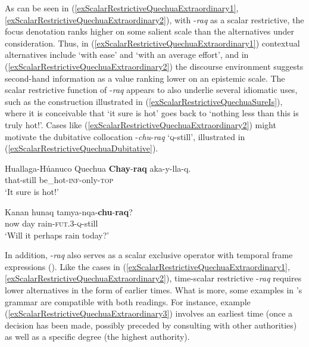 As can be seen in (\ref{exScalarRestrictiveQuechuaExtraordinary1}, \ref{exScalarRestrictiveQuechuaExtraordinary2}), with \mbox{-\textit{raq}} as a scalar restrictive, the focus denotation ranks higher on some salient scale than the alternatives under consideration. Thus, in (\ref{exScalarRestrictiveQuechuaExtraordinary1}) contextual alternatives include \lq with ease' and \lq with an average effort', and in (\ref{exScalarRestrictiveQuechuaExtraordinary2}) the discourse environment suggests second-hand information as a value ranking lower on an epistemic scale. The scalar restrictive function of \mbox{-\textit{raq}} appears to also underlie several idiomatic uses, such as the construction illustrated in (\ref{exScalarRestrictiveQuechuaSureIs}), where it is conceivable that \lq it sure is hot' goes back to \lq nothing less than this is truly hot!'. Cases like (\ref{exScalarRestrictiveQuechuaExtraordinary2}) might motivate the dubitative collocation \mbox{-\textit{chu}}\mbox{-\textit{raq}} \lq \textsc{q}-still', illustrated in (\ref{exScalarRestrictiveQuechuaDubitative}).\pagebreak

\begin{exe}
	\ex 
	\begin{xlist}
		\exi{} Huallaga-Húanuco Quechua
		\ex \label{exScalarRestrictiveQuechuaSureIs}
		\gll \textbf{Chay}-\textbf{raq} aka-y-lla-q.\\
		that-still be\_hot-\textsc{inf}-only-\textsc{top}\\
		\glt \lq It sure is hot!'
	
		\ex \label{exScalarRestrictiveQuechuaDubitative}
		\gll Kanan hunaq tamya-nqa-\textbf{chu}-\textbf{raq}?\\
		now day rain-\textsc{fut}.3-\textsc{q}-still\\
		\glt \lq Will it perhaps rain today?'
		\\\parencite[327, 446]{Weber1989}
	\end{xlist}
\end{exe}

In addition, \mbox{-\textit{raq}} also serves as a scalar exclusive operator with temporal frame expressions (). Like the cases in (\ref{exScalarRestrictiveQuechuaExtraordinary1}, \ref{exScalarRestrictiveQuechuaExtraordinary2}), time-scalar restrictive \mbox{-\textit{raq}} requires lower alternatives in the form of earlier times. What is more, some examples in \citeauthor{Weber1989}'s grammar are compatible with both readings. For instance, example (\ref{exScalarRestrictiveQuechuaExtraordinary3}) involves an earliest time (once a decision has been made, possibly preceded by consulting with other authorities) as well as a specific degree (the highest authority).

